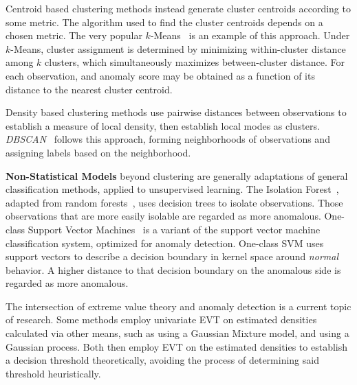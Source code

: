 Centroid based clustering methods instead generate cluster centroids 
    according to some metric.  The algorithm used to find the cluster centroids 
    depends on a chosen metric.  The very popular $k$-Means~\citep{hartigan1979} 
    is an example of this approach. Under $k$-Means, cluster assignment is 
    determined by minimizing within-cluster distance among $k$ clusters, which 
    simultaneously maximizes between-cluster distance. For each observation, 
    and anomaly score may be obtained as a function of its distance to the 
    nearest cluster centroid.  
    
Density based clustering methods use pairwise distances between observations to 
    establish a measure of local density, then establish local modes as 
    clusters.  \emph{DBSCAN}~\citep{ester1996} follows this approach, forming 
    neighborhoods of observations and assigning labels based on the 
    neighborhood. 
    
{\bf Non-Statistical Models} beyond clustering are generally adaptations 
    of general classification methods, applied to unsupervised learning.  
    The Isolation Forest~\citep{liu2000}, adapted from random 
    forests~\citep{breiman2001}, uses decision trees to isolate observations.
    Those observations that are more easily isolable are regarded as more 
    anomalous.  One-class Support Vector Machines~\citep{chang2011} is a variant
    of the support vector machine classification system, optimized for 
    anomaly detection.  One-class SVM uses support vectors to describe a 
    decision boundary in kernel space around \emph{normal} behavior. A higher 
    distance to that decision boundary on the anomalous side is regarded as 
    more anomalous.
    
The intersection of extreme value theory and anomaly detection is a current 
    topic of research.  Some methods employ univariate EVT on estimated 
    densities calculated via other means, such as \cite{clifton2011} using a 
    Gaussian Mixture model, and \cite{gu2021} using a Gaussian process.  Both 
    then employ EVT on the estimated densities to establish a decision 
    threshold theoretically, avoiding the process of determining said
    threshold heuristically.

